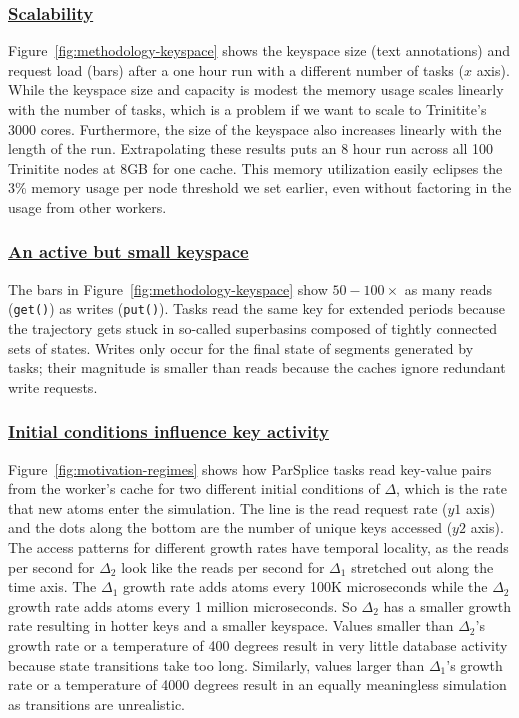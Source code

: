 \subsubsection{\underline{Scalability}} Figure~\ref{fig:methodology-keyspace} shows the
keyspace size (text annotations) and request load (bars) after a one hour run
with a different number of tasks (\(x\) axis). While the keyspace size and
capacity is modest the memory usage scales linearly with the number
of tasks, which is a problem if we want to scale to Trinitite's 3000 cores.
Furthermore, the size of the keyspace also increases linearly with the length
of the run.  Extrapolating these results puts an 8 hour run across all 100
Trinitite nodes at 8GB for one cache.  This memory utilization easily eclipses
the 3\% memory usage per node threshold we set earlier, even without factoring
in the usage from other workers.

\subsubsection{\underline{An active but small keyspace}}

The bars in Figure~\ref{fig:methodology-keyspace} show \(50-100\times\) as many
reads (\texttt{get()}) as writes (\texttt{put()}).  Tasks read the same key for
extended periods because the trajectory gets stuck in so-called superbasins
composed of tightly connected sets of states.  Writes only occur for the final
state of segments generated by tasks; their magnitude is smaller than reads
because the caches ignore redundant write requests. 

\subsubsection{\underline{Initial conditions influence key activity}}
\label{sec:delta}
Figure~\ref{fig:motivation-regimes} shows how ParSplice tasks read key-value
pairs from the worker's cache for two different initial conditions of
\(\Delta\), which is the rate that new atoms enter the simulation.  The line is
the read request rate (\(y1\) axis) and the dots along the bottom are the
number of unique keys accessed (\(y2\) axis).  The access patterns for
different growth rates have temporal locality, as the reads per second for
\(\Delta_2\) look like the reads per second for \(\Delta_1\) stretched out
along the time axis.  The \(\Delta_1\) growth rate adds atoms every 100K
microseconds while the \(\Delta_2\) growth rate adds atoms every 1 million
microseconds. So \(\Delta_2\) has a smaller growth rate resulting in hotter
keys and a smaller keyspace.  Values smaller than \(\Delta_2\)'s growth rate or
a temperature of 400 degrees result in very little database activity because
state transitions take too long. Similarly, values larger than \(\Delta_1\)'s
growth rate or a temperature of 4000 degrees result in an equally meaningless
simulation as transitions are unrealistic.  

